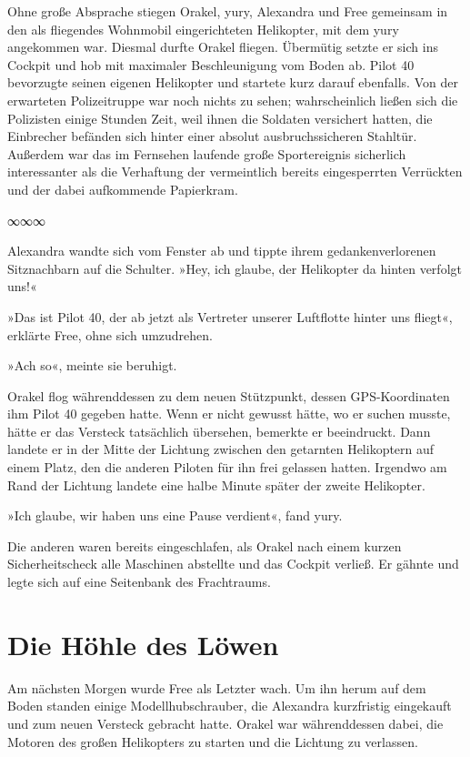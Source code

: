 Ohne große Absprache stiegen Orakel, yury, Alexandra und Free gemeinsam in den als fliegendes Wohnmobil eingerichteten Helikopter, mit dem yury angekommen war. Diesmal durfte Orakel fliegen. Übermütig setzte er sich ins Cockpit und hob mit maximaler Beschleunigung vom Boden ab. Pilot 40 bevorzugte seinen eigenen Helikopter und startete kurz darauf ebenfalls. Von der erwarteten Polizeitruppe war noch nichts zu sehen; wahrscheinlich ließen sich die Polizisten einige Stunden Zeit, weil ihnen die Soldaten versichert hatten, die Einbrecher befänden sich hinter einer absolut ausbruchssicheren Stahltür. Außerdem war das im Fernsehen laufende große Sportereignis sicherlich interessanter als die Verhaftung der vermeintlich bereits eingesperrten Verrückten und der dabei aufkommende Papierkram.

\begin{center}
    ∞∞∞
\end{center}

Alexandra wandte sich vom Fenster ab und tippte ihrem gedankenverlorenen Sitznachbarn auf die Schulter. »Hey, ich glaube, der Helikopter da hinten verfolgt uns!«

»Das ist Pilot 40, der ab jetzt als Vertreter unserer Luftflotte hinter uns fliegt«, erklärte Free, ohne sich umzudrehen.

»Ach so«, meinte sie beruhigt.

Orakel flog währenddessen zu dem neuen Stützpunkt, dessen GPS-Koordinaten ihm Pilot 40 gegeben hatte. Wenn er nicht gewusst hätte, wo er suchen musste, hätte er das Versteck tatsächlich übersehen, bemerkte er beeindruckt. Dann landete er in der Mitte der Lichtung zwischen den getarnten Helikoptern auf einem Platz, den die anderen Piloten für ihn frei gelassen hatten. Irgendwo am Rand der Lichtung landete eine halbe Minute später der zweite Helikopter.

»Ich glaube, wir haben uns eine Pause verdient«, fand yury.

Die anderen waren bereits eingeschlafen, als Orakel nach einem kurzen Sicherheitscheck alle Maschinen abstellte und das Cockpit verließ. Er gähnte und legte sich auf eine Seitenbank des Frachtraums.


\chapter{Die Höhle des Löwen}

Am nächsten Morgen wurde Free als Letzter wach. Um ihn herum auf dem Boden standen einige Modellhubschrauber, die Alexandra kurzfristig eingekauft und zum neuen Versteck gebracht hatte. Orakel war währenddessen dabei, die Motoren des großen Helikopters zu starten und die Lichtung zu verlassen.

